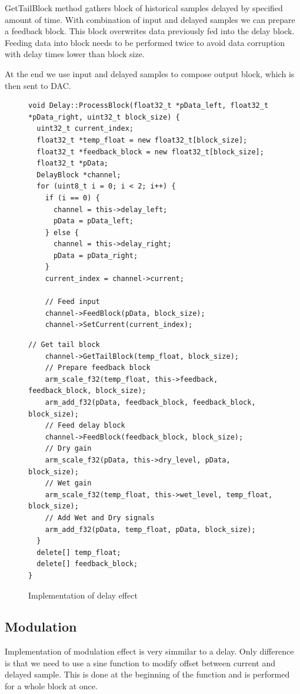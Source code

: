 \documentclass[a4paper,twoside,12pt]{book}
\begin{document}
GetTailBlock method gathers block of historical samples
delayed by specified amount of time.
With combination of input and delayed samples
we can prepare a feedback block.
This block overwrites data previously fed into the delay block.
Feeding data into block needs to be performed twice
to avoid data corruption with delay times lower than block size.

At the end we use input and delayed samples
to compose output block, which is then sent to DAC.

\begin{figure}[H]
\centering
\begin{lstlisting}
void Delay::ProcessBlock(float32_t *pData_left, float32_t *pData_right, uint32_t block_size) {
  uint32_t current_index;
  float32_t *temp_float = new float32_t[block_size];
  float32_t *feedback_block = new float32_t[block_size];
  float32_t *pData;
  DelayBlock *channel;
  for (uint8_t i = 0; i < 2; i++) {
    if (i == 0) {
      channel = this->delay_left;
      pData = pData_left;
    } else {
      channel = this->delay_right;
      pData = pData_right;
    }
    current_index = channel->current;

    // Feed input
    channel->FeedBlock(pData, block_size);
    channel->SetCurrent(current_index);
\end{lstlisting}
\end{figure}
\newpage
\begin{figure}[H]
\begin{lstlisting}[firstnumber=20]
    // Get tail block
    channel->GetTailBlock(temp_float, block_size);
    // Prepare feedback block
    arm_scale_f32(temp_float, this->feedback, feedback_block, block_size);
    arm_add_f32(pData, feedback_block, feedback_block, block_size);
    // Feed delay block
    channel->FeedBlock(feedback_block, block_size);
    // Dry gain
    arm_scale_f32(pData, this->dry_level, pData, block_size);
    // Wet gain
    arm_scale_f32(temp_float, this->wet_level, temp_float, block_size);
    // Add Wet and Dry signals
    arm_add_f32(pData, temp_float, pData, block_size);
  }
  delete[] temp_float;
  delete[] feedback_block;
}
\end{lstlisting}
\caption{Implementation of delay effect}
\label{fig:delay}
\end{figure}

\subsection{Modulation}
Implementation of modulation effect is very simmilar to a delay.
Only difference is that we need to use a sine function
to modify offset between current and delayed sample.
This is done at the beginning of the function
and is performed for a whole block at once.
\end{document}
